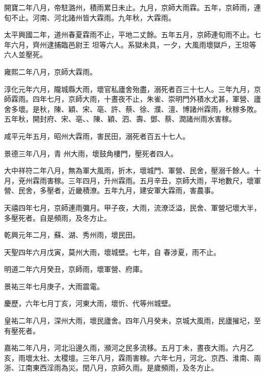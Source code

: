 \begin{pinyinscope}
 開寶二年八月，帝駐潞州，積雨累日未止。九月，京師大雨霖。五年，京師雨，連旬不止。河南、河北諸州皆大霖雨。九年秋，大霖雨。



 太平興國二年，道州春夏霖雨不止，平地二丈餘。五年五月，京師連旬雨不止。七年六月，齊州逮捕臨邑尉王
 坦等六人。系獄未具，一夕，大風雨壞獄戶，王坦等六人並壓死。



 雍熙二年八月，京師大霖雨。



 淳化元年六月，隴城縣大雨，壞官私廬舍殆盡，溺死者百三十七人。三年九月，京師霖雨。四年七月，京師大雨，十晝夜不止，朱雀、崇明門外積水尤甚，軍營、廬舍多壞。是秋，陳、穎、宋、亳、許、蔡、徐、濮、澶、博諸州霖雨，秋稼多敗。五年秋，開封府、宋、亳、、陳、穎、泗、壽、鄧、蔡、潤諸州雨水害稼。



 咸平元年五月，昭州大霖雨，害民田，溺死者百五十七人。



 景德三年八月，青
 州大雨，壞鼓角樓門，壓死者四人。



 大中祥符二年八月，無為軍大風雨，折木，壞城門、軍營、民舍，壓溺千餘人。十月，兗州霖雨害稼。三年四月，升州霖雨。五月辛丑，京師大雨，平地數尺，壞軍營、民舍，多壓者，近畿積潦。五年九月，建安軍大霖雨，害農事。



 天禧四年七月，京師連雨彌月。甲子夜，大雨，流潦泛溢，民舍、軍營圮壞大半，多壓死者。自是頻雨，及冬方止。



 乾興元年二月，蘇、湖、秀州雨，壞民田。



 天聖四年六月戊寅，莫州大雨，壞城壁。七年，自
 春涉夏，雨不止。



 明道二年六月癸丑，京師雨，壞軍營、府庫。



 景祐三年七月庚子，大雨震電。



 慶歷，六年七月丁亥，河東大雨，壞忻、代等州城壁。



 皇祐二年八月，深州大雨，壞民廬舍。四年八月癸未，京城大風雨，民廬摧圮，至有壓死者。



 嘉祐二年八月，河北沿邊久雨，瀕河之民多流移。五月丁未，晝夜大雨。六月乙亥，雨壞太社、太稷壇。三年八月，霖雨害稼。六年七月，河北、京西、淮南、兩浙、江南東西淫雨為災。閏八月，京師久雨。是歲頻雨，及冬方止。




\end{pinyinscope}
